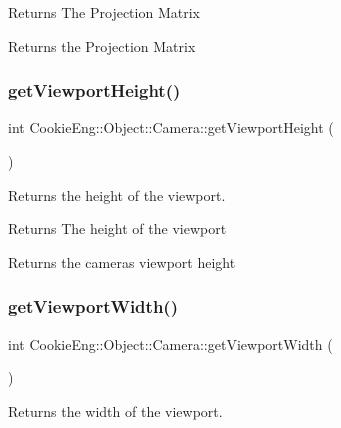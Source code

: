 \begin{DoxyReturn}{Returns}
The Projection Matrix
\end{DoxyReturn}
Returns the Projection Matrix \mbox{\label{class_cookie_eng_1_1_object_1_1_camera_ad3cd942d665b97a64e19b68b5d0fe6fb}} 
\subsubsection{\texorpdfstring{get\+Viewport\+Height()}{getViewportHeight()}}
{\footnotesize\ttfamily int Cookie\+Eng\+::\+Object\+::\+Camera\+::get\+Viewport\+Height (\begin{DoxyParamCaption}{ }\end{DoxyParamCaption})\hspace{0.3cm}{\ttfamily [inline]}}



Returns the height of the viewport. 

\begin{DoxyReturn}{Returns}
The height of the viewport
\end{DoxyReturn}
Returns the camera\textquotesingle{}s viewport height \mbox{\label{class_cookie_eng_1_1_object_1_1_camera_ae21ba7bbc237d0ddfac4d9531ba4597e}} 
\subsubsection{\texorpdfstring{get\+Viewport\+Width()}{getViewportWidth()}}
{\footnotesize\ttfamily int Cookie\+Eng\+::\+Object\+::\+Camera\+::get\+Viewport\+Width (\begin{DoxyParamCaption}{ }\end{DoxyParamCaption})\hspace{0.3cm}{\ttfamily [inline]}}



Returns the width of the viewport. 

